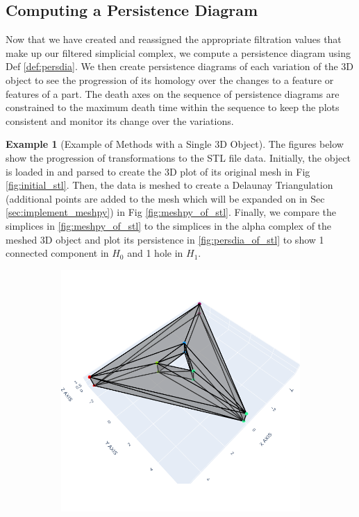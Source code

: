 \documentclass[ma]{uncgdissertationexp}
\theoremstyle{plain}
\theoremstyle{definition}
\newtheorem{example}[theorem]{Example}
\theoremstyle{remark}
\begin{document}
\subsection{Computing a Persistence Diagram}
\label{sec:compute_persdia}
\par Now that we have created and reassigned the appropriate filtration values that make up our filtered simplicial complex, we compute a persistence diagram using Def \ref{def:persdia}. We then create persistence diagrams of each variation of the 3D object to see the progression of its homology over the changes to a feature or features of a part. The death axes on the sequence of persistence diagrams are constrained to the maximum death time within the sequence to keep the plots consistent and monitor its change over the variations.
\newpage
\begin{example}[Example of Methods with a Single 3D Object]
\par The figures below show the progression of transformations to the STL file data. Initially, the object is loaded in and parsed to create the 3D plot of its original mesh in Fig \ref{fig:initial_stl}. Then, the data is meshed to create a Delaunay Triangulation (additional points are added to the mesh which will be expanded on in Sec \ref{sec:implement_meshpy}) in Fig \ref{fig:meshpy_of_stl}. Finally, we compare the simplices in \ref{fig:meshpy_of_stl} to the simplices in the alpha complex of the meshed 3D object and plot its persistence in \ref{fig:persdia_of_stl} to show 1 connected component in $H_{0}$ and 1 hole in $H_{1}$.
\begin{figure}[H]
    \centering
    \begin{subfigure}[b]{0.3\textwidth}
        \centering
        \includegraphics[width=\textwidth]{Final Run, (triangular prism - triangle hole) ast plotly screenshot.png}

\end{subfigure}
\end{figure}
\end{example}
\end{document}
